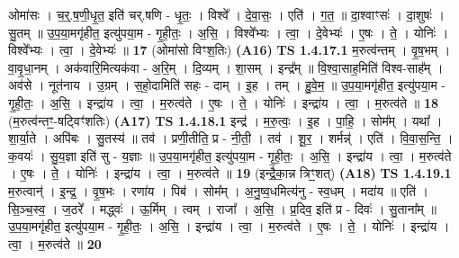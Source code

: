 \documentclass[17pt]{extarticle}
\begin{document}
                  ओमा॑सः । च॒र्॒.ष॒णी॒धृ॒त॒ इति॑ चर्.षणि - धृ॒तः॒ । विश्वे᳚ । दे॒वा॒सः॒ । एति॑ । ग॒त॒ ॥ दा॒श्वाꣳसः॑ । दा॒शुषः॑ । सु॒तम् ॥ उ॒प॒या॒मगृ॑हीत॒ इत्यु॑पया॒म - गृ॒ही॒तः॒ । अ॒सि॒ । विश्वे᳚भ्यः । त्वा॒ । दे॒वेभ्यः॑ । ए॒षः । ते॒ । योनिः॑ । विश्वे᳚भ्यः । त्वा॒ । दे॒वेभ्यः॑ ॥ \textbf{  17} \newline
                  \newline
                      (ओमा॑सो विꣳश॒तिः)  \textbf{(A16)} \newline \newline
                                \textbf{ TS 1.4.17.1} \newline
                  म॒रुत्व॑न्तम् । वृ॒ष॒भम् । वा॒वृ॒धा॒नम् । अक॑वारि॒मित्यक॑वा - अ॒रि॒म् । दि॒व्यम् । शा॒सम् । इन्द्र᳚म् ॥ वि॒श्वा॒साह॒मिति॑ विश्व-साह᳚म् । अव॑से । नूत॑नाय । उ॒ग्रम् । स॒हो॒दामिति॑ सहः - दाम् । इ॒ह । तम् । हु॒वे॒म॒ ॥ उ॒प॒या॒मगृ॑हीत॒ इत्यु॑पया॒म - गृ॒ही॒तः॒ । अ॒सि॒ । इन्द्रा॑य । त्वा॒ । म॒रुत्व॑ते । ए॒षः । ते॒ । योनिः॑ । इन्द्रा॑य । त्वा॒ । म॒रुत्व॑ते ॥ \textbf{  18} \newline
                  \newline
                      (म॒रुत्व॑न्तꣳ॒॒-षट्विꣳ॑शतिः)  \textbf{(A17)} \newline \newline
                                \textbf{ TS 1.4.18.1} \newline
                  इन्द्र॑ । म॒रु॒त्वः॒ । इ॒ह । पा॒हि॒ । सोम᳚म् । यथा᳚ । शा॒र्या॒ते । अपि॑बः । सु॒तस्य॑ ॥ तव॑ । प्रणी॒तीति॒ प्र - नी॒ती॒ । तव॑ । शू॒र॒ । शर्मन्न्॑ । एति॑ । वि॒वा॒स॒न्ति॒ । क॒वयः॑ । सु॒य॒ज्ञा इति॑ सु - य॒ज्ञाः ॥ उ॒प॒या॒मगृ॑हीत॒ इत्यु॑पया॒म - गृ॒ही॒तः॒ । अ॒सि॒ । इन्द्रा॑य । त्वा॒ । म॒रुत्व॑ते । ए॒षः । ते॒ । योनिः॑ । इन्द्रा॑य । त्वा॒ । म॒रुत्व॑ते ॥ \textbf{  19 } \newline
                  \newline
                      (इन्द्रै॒का॒न्न त्रिꣳ॒॒शत्)  \textbf{(A18)} \newline \newline
                                \textbf{ TS 1.4.19.1} \newline
                  म॒रुत्वान्॑ । इ॒न्द्र॒ । वृ॒ष॒भः । रणा॑य । पिब॑ । सोम᳚म् । अ॒नु॒ष्व॒धमित्य॑नु - स्व॒धम् । मदा॑य ॥ एति॑ । सि॒ञ्च॒स्व॒ । ज॒ठरे᳚ । मद्ध्वः॑ । ऊ॒र्मिम् । त्वम् । राजा᳚ । अ॒सि॒ । प्र॒दिव॒ इति॑ प्र - दिवः॑ । सु॒ताना᳚म् ॥ उ॒प॒या॒मगृ॑हीत॒ इत्यु॑पया॒म - गृ॒ही॒तः॒ । अ॒सि॒ । इन्द्रा॑य । त्वा॒ । म॒रुत्व॑ते । ए॒षः । ते॒ । योनिः॑ । इन्द्रा॑य । त्वा॒ । म॒रुत्व॑ते ॥ \textbf{  20} \newline
\end{document}
